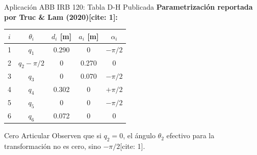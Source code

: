 \documentclass[aspectratio=169, table, xcdraw]{beamer}
\begin{document}
\begin{frame}{Aplicación ABB IRB 120: Tabla D-H Publicada}
    \textbf{Parametrización reportada por Truc \& Lam (2020)[cite: 1]:}
    
    \begin{table}[]
        \centering
        \renewcommand{\arraystretch}{1.2}
        \begin{tabular}{c c c c c}
        \toprule
        $i$ & $\theta_i$ & $d_i$ [m] & $a_i$ [m] & $\alpha_i$ \\ \midrule
        1 & $q_1$ & 0.290 & 0 & $-\pi/2$ \\
        2 & $q_2 - \pi/2$ & 0 & 0.270 & 0 \\
        3 & $q_3$ & 0 & 0.070 & $-\pi/2$ \\
        4 & $q_4$ & 0.302 & 0 & $+\pi/2$ \\
        5 & $q_5$ & 0 & 0 & $-\pi/2$ \\
        6 & $q_6$ & 0.072 & 0 & 0 \\ \bottomrule
        \end{tabular}
    \end{table}
    
    \begin{alertblock}{Cero Articular}
        Observen que si $q_2 = 0$, el ángulo $\theta_2$ efectivo para la transformación no es cero, sino $-\pi/2$[cite: 1].
    \end{alertblock}
\end{frame}
\end{document}
